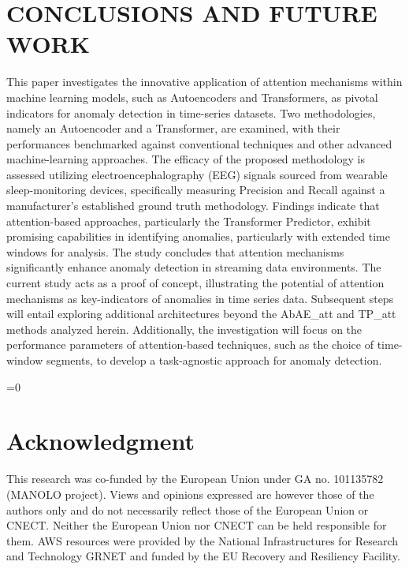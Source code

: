 \documentclass[conference]{IEEEtran}
\def\anon{0}
\begin{document}
\section{CONCLUSIONS AND FUTURE WORK}
\label{sec:conc}
This paper investigates the innovative application of attention mechanisms within machine learning models, such as Autoencoders and Transformers, as pivotal indicators for anomaly detection in time-series datasets. Two methodologies, namely an Autoencoder and a Transformer, are examined, with their performances benchmarked against conventional techniques and other advanced machine-learning approaches. The efficacy of the proposed methodology is assessed utilizing electroencephalography (EEG) signals sourced from wearable sleep-monitoring devices, specifically measuring Precision and Recall against a manufacturer's established ground truth methodology. Findings indicate that attention-based approaches, particularly the Transformer Predictor, exhibit promising capabilities in identifying anomalies, particularly with extended time windows for analysis. The study concludes that attention mechanisms significantly enhance anomaly detection in streaming data environments.
The current study acts as a proof of concept, illustrating the potential of attention mechanisms as key-indicators of anomalies in time series data. Subsequent steps will entail exploring additional architectures beyond the AbAE\_att and TP\_att methods analyzed herein. Additionally, the investigation will focus on the performance parameters of attention-based techniques, such as the choice of time-window segments, to develop a task-agnostic approach for anomaly detection.



\ifnum\anon=0

\section*{Acknowledgment}

This research was co-funded by the European Union under GA no. 101135782 (MANOLO project). Views and opinions expressed are however those of the authors only and do not necessarily reflect those of the European Union or CNECT. Neither the European Union nor CNECT can be held responsible for them.
AWS resources were provided by the National Infrastructures for Research and Technology GRNET and funded by the EU Recovery and Resiliency Facility.

\fi




\end{document}
